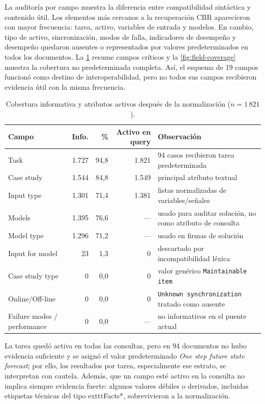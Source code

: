 \documentclass[11pt,a4paper]{article}
\begin{document}
La auditoría por campo muestra la diferencia entre compatibilidad sintáctica y contenido útil. Los elementos más cercanos a la recuperación CBR aparecieron con mayor frecuencia: tarea, activo, variables de entrada y modelos. En cambio, tipo de activo, sincronización, modos de falla, indicadores de desempeño y desempeño quedaron ausentes o representados por valores predeterminados en todos los documentos. La \cref{tab:coverage} resume campos críticos y la \cref{fig:field-coverage} muestra la cobertura no predeterminada completa. Así, el esquema de 19 campos funcionó como destino de interoperabilidad, pero no todos sus campos recibieron evidencia útil con la misma frecuencia.

\begin{table}[H]
\centering
\caption{Cobertura informativa y atributos activos después de la normalización ($n = 1\,821$).}
\label{tab:coverage}
\footnotesize
\begin{tabularx}{\linewidth}{lrrrX}
\toprule
Campo & Info. & \% & Activo en query & Observación \\
\midrule
Task & 1.727 & 94,8 & 1.821 & 94 casos recibieron tarea predeterminada \\
Case study & 1.544 & 84,8 & 1.549 & principal atributo textual \\
Input type & 1.301 & 71,4 & 1.381 & listas normalizadas de variables/señales \\
Models & 1.395 & 76,6 & --- & usado para auditar solución, no como atributo de consulta \\
Model type & 1.296 & 71,2 & --- & usado en firmas de solución \\
Input for model & 23 & 1,3 & 0 & descartado por incompatibilidad léxica \\
Case study type & 0 & 0,0 & 0 & valor genérico \texttt{Maintainable item} \\
Online/Off-line & 0 & 0,0 & 0 & \texttt{Unknown synchronization} tratado como ausente \\
Failure modes / performance & 0 & 0,0 & --- & no informativos en el puente actual \\
\bottomrule
\end{tabularx}
\end{table}

La tarea quedó activa en todas las consultas, pero en 94 documentos no hubo evidencia suficiente y se asignó el valor predeterminado \emph{One step future state forecast}; por ello, los resultados por tarea, especialmente ese estrato, se interpretan con cautela. Además, que un campo esté activo en la consulta no implica siempre evidencia fuerte: algunos valores débiles o derivados, incluidas etiquetas técnicas del tipo 	exttt{Facts*}, sobrevivieron a la normalización.
\end{document}
